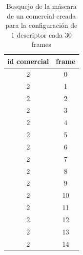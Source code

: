 \documentclass[14pt,letterpaper,hidelinks]{extarticle}
\begin{document}
\begin{table}[]
\centering
\begin{tabular}{@{}cc@{}}
\toprule
id comercial & frame \\ \midrule
2 & 0 \\
2 & 1 \\
2 & 2 \\
2 & 3 \\
2 & 4 \\
2 & 5 \\
2 & 6 \\
2 & 7 \\
2 & 8 \\
2 & 9 \\
2 & 10 \\
2 & 11 \\
2 & 12 \\
2 & 13 \\
2 & 14 \\ \bottomrule
\end{tabular}
\captionsetup{justification=centering,margin=2cm}
\caption{Bosquejo de la máscara de un comercial creada para la configuración de 1 descriptor cada 30 frames\label{tab:mask}}
\end{table}
\end{document}
